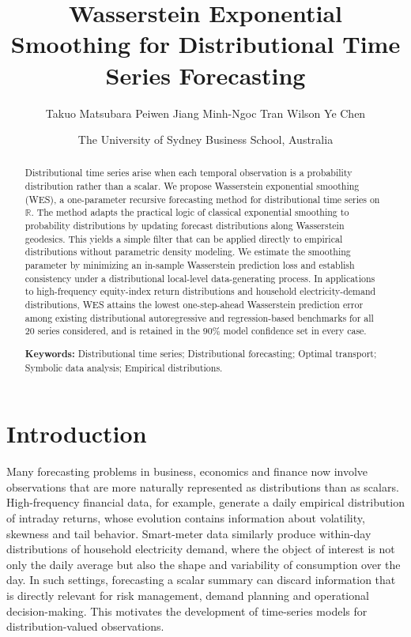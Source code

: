 \documentclass[a4paper, 11pt]{article}
\title{Wasserstein Exponential Smoothing for Distributional Time Series Forecasting}
\author{
	Takuo Matsubara \quad Peiwen Jiang \quad Minh-Ngoc Tran \quad Wilson Ye Chen
}
\date{
	\small{The University of Sydney Business School, Australia}
}
\newcommand{\R}{\mathbb{R}}
\theoremstyle{definition}
\begin{document}
\maketitle

\begin{abstract}
Distributional time series arise when each temporal observation is a probability distribution rather than a scalar. 
We propose Wasserstein exponential smoothing (WES), a one-parameter recursive forecasting method for distributional time series on $\R$. 
The method adapts the practical logic of classical exponential smoothing to probability distributions by updating forecast distributions along Wasserstein geodesics. 
This yields a simple filter that can be applied directly to empirical distributions without parametric density modeling. 
We estimate the smoothing parameter by minimizing an in-sample Wasserstein prediction loss and establish consistency under a distributional local-level data-generating process. 
In applications to high-frequency equity-index return distributions and household electricity-demand distributions, WES attains the lowest one-step-ahead Wasserstein prediction error among existing distributional autoregressive and regression-based benchmarks for all $20$ series considered, and is retained in the $90\%$ model confidence set in every case.

\vspace{10pt}

\noindent\textbf{Keywords:} Distributional time series; Distributional forecasting; Optimal transport; Symbolic data analysis; Empirical distributions.
\end{abstract}




\section{Introduction}

Many forecasting problems in business, economics and finance now involve observations that are more naturally represented as distributions than as scalars. High-frequency financial data, for example, generate a daily empirical distribution of intraday returns, whose evolution contains information about volatility, skewness and tail behavior. Smart-meter data similarly produce within-day distributions of household electricity demand, where the object of interest is not only the daily average but also the shape and variability of consumption over the day. In such settings, forecasting a scalar summary can discard information that is directly relevant for risk management, demand planning and operational decision-making. This motivates the development of time-series models for distribution-valued observations.
\end{document}
